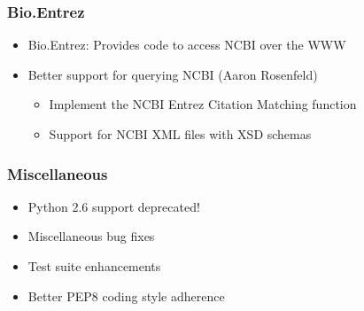 \documentclass[trans]{beamer}
\begin{document}
\frame
{
  \frametitle{Bio.Entrez}
  
  \begin{itemize}
  \item Bio.Entrez: Provides code to access NCBI over the WWW
  \item Better support for querying NCBI (Aaron Rosenfeld)
  \begin{itemize}
  \item Implement the NCBI Entrez Citation Matching function
  \item Support for NCBI XML files with XSD schemas
  \end{itemize}
  \end{itemize}  
}

\frame
{
  \frametitle{Miscellaneous}

  \begin{itemize}
  \item Python 2.6 support deprecated!
  \item Miscellaneous bug fixes
  \item Test suite enhancements
  \item Better PEP8 coding style adherence
  \end{itemize}
}
\end{document}
